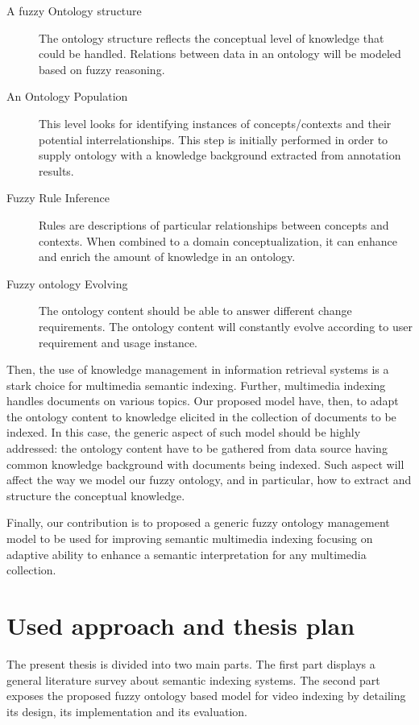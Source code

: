 	\begin{description}
		\item[A fuzzy Ontology structure] The ontology structure reflects the conceptual level of knowledge that could be handled. Relations between data in an ontology will be modeled based on fuzzy reasoning.  
		
		\item[An Ontology Population] This level looks for identifying instances of concepts/contexts and their potential interrelationships. This step is initially performed in order to supply ontology with a knowledge background extracted from annotation results. 
		
		\item[Fuzzy Rule Inference] Rules are descriptions of particular relationships between concepts and contexts. When combined to a domain conceptualization, it can enhance and enrich the amount of knowledge in an ontology.
		
		\item[Fuzzy ontology Evolving]The ontology content should be able to answer different change requirements. The ontology content will constantly evolve according to user requirement and usage instance.
	\end{description}
	
	Then, the use of knowledge management in information retrieval systems is a stark choice for multimedia semantic indexing. Further, multimedia indexing handles documents on various topics. Our proposed model have, then, to adapt the ontology content to knowledge elicited in the collection of documents to be indexed. In this case, the generic aspect of such model should be highly addressed: the ontology content have to be gathered from data source having common knowledge background with documents being indexed. Such aspect will affect the way we model our fuzzy ontology, and in particular, how to extract and structure the conceptual knowledge.
	
	Finally, our contribution is to proposed a generic fuzzy ontology management model to be used for improving semantic multimedia indexing focusing on adaptive ability to enhance a semantic interpretation for any multimedia collection.
	
	\section*{Used approach and thesis plan}
	
The present thesis is divided into two main parts. The first part displays a general literature survey about semantic indexing systems. 
The second part exposes the proposed fuzzy ontology based model for video indexing by detailing its design, its implementation and its evaluation.

